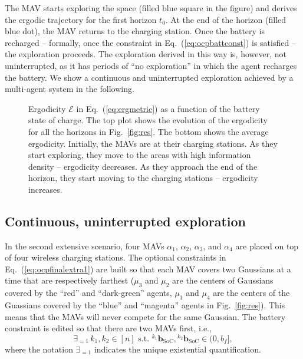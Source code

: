 \documentclass[letterpaper,10pt,conference,twoside]{IEEEtran}
\theoremstyle{definition}
\begin{document}
The MAV starts exploring the space (filled blue square in the figure) and derives the ergodic trajectory for the first horizon $t_0$. At the end of the horizon (filled blue dot), the MAV returns to the charging station. Once the battery is recharged -- formally, once the constraint in Eq.~(\ref{eq:ocpbattconst}) is satisfied -- the exploration proceeds. The exploration derived in this way is, however, not uninterrupted, as it has periods of ``no exploration'' in which the agent recharges the battery. We show a continuous and uninterrupted exploration achieved by a multi-agent system in the following.


\begin{figure}[t!]
  \begin{minipage}[t!]{.5\columnwidth}
    \vspace*{-.2cm}
    
  \end{minipage}
  \begin{minipage}[c]{.48\columnwidth}
    \vspace*{.05cm}
    \caption{Ergodicity $\mathcal{E}$ in Eq.~(\ref{eq:ergmetric}) as a function of the battery state of charge. The top plot shows the evolution of the ergodicity for all the horizons in Fig.~\ref{fig:res}. The bottom shows the average ergodicity. Initially, the MAVs are at their charging stations. As they start exploring, they move to the areas with high information density -- ergodicity decreases. As they approach the end of the horizon, they start moving to the charging stations -- ergodicity increases.}
    \label{fig:ergo}
  \end{minipage}
  \vspace*{-.3cm}
\end{figure}

\subsection*{Continuous, uninterrupted exploration}
\noindent
In the second extensive scenario, four MAVs $\alpha_1$, $\alpha_2$, $\alpha_3$, and $\alpha_4$ are placed on top of four wireless charging stations. The optional constraints in Eq.~(\ref{eq:ocpfinalextra1}) are built so that each MAV covers two Gaussians at a time that are respectively farthest ($\mu_3$ and $\mu_2$ are the centers of Gaussians covered by the ``red'' and ``dark-green'' agents, $\mu_1$ and $\mu_4$ are the centers of the Guassians covered by the ``blue'' and ``magenta'' agents in Fig.~\ref{fig:res}). This means that the MAVs will never compete for the same Gaussian. The battery constraint is edited so that there are two MAVs first, i.e.,
\begin{equation}
\exists_{=1}\, k_1,k_2\in[n]\text{ s.t. }{}^{k_1} \mathbf{b}_{\text{SoC}},{}^{k_2} \mathbf{b}_{\text{SoC}}\in(0,b_f],
\end{equation} 
where the notation $\exists_{=1}$ indicates the unique existential quantification.
\end{document}

